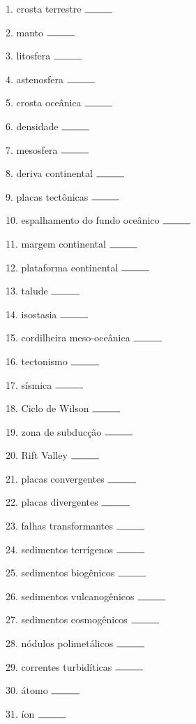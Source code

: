 \documentclass[a4paper,10pt]{article}
\begin{document}
\begin{multicols}{2}

1. crosta terrestre $\rule{1cm}{0.15mm}$

2. manto $\rule{1cm}{0.15mm}$

3. litosfera $\rule{1cm}{0.15mm}$

4. astenosfera $\rule{1cm}{0.15mm}$

5. crosta oceânica $\rule{1cm}{0.15mm}$

6. densidade $\rule{1cm}{0.15mm}$

7. mesosfera $\rule{1cm}{0.15mm}$

8. deriva continental $\rule{1cm}{0.15mm}$

9. placas tectônicas $\rule{1cm}{0.15mm}$

10. espalhamento do fundo oceânico $\rule{1cm}{0.15mm}$

11. margem continental $\rule{1cm}{0.15mm}$

12. plataforma continental $\rule{1cm}{0.15mm}$

13. talude $\rule{1cm}{0.15mm}$

14. isostasia $\rule{1cm}{0.15mm}$

15. cordilheira meso-oceânica $\rule{1cm}{0.15mm}$

16. tectonismo $\rule{1cm}{0.15mm}$

17. sísmica $\rule{1cm}{0.15mm}$

18. Ciclo de Wilson $\rule{1cm}{0.15mm}$

19. zona de subducção $\rule{1cm}{0.15mm}$

20. Rift Valley $\rule{1cm}{0.15mm}$

21. placas convergentes $\rule{1cm}{0.15mm}$

22. placas divergentes $\rule{1cm}{0.15mm}$

23. falhas transformantes $\rule{1cm}{0.15mm}$

24. sedimentos terrígenos $\rule{1cm}{0.15mm}$

25. sedimentos biogênicos $\rule{1cm}{0.15mm}$

26. sedimentos vulcanogênicos $\rule{1cm}{0.15mm}$

27. sedimentos cosmogênicos $\rule{1cm}{0.15mm}$

28. nódulos polimetálicos $\rule{1cm}{0.15mm}$

29. correntes turbidíticas $\rule{1cm}{0.15mm}$

30. átomo $\rule{1cm}{0.15mm}$

31. íon $\rule{1cm}{0.15mm}$


\end{multicols}
\end{document}

